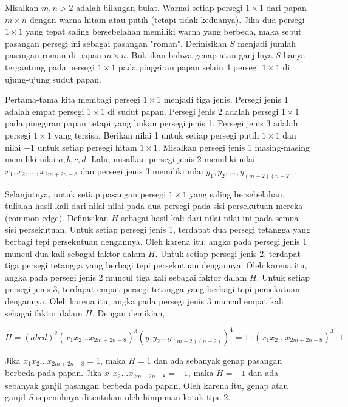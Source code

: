 \documentclass[12pt]{scrartcl}
\begin{document}
\begin{soaljawab}
    Misalkan $m,n > 2$ adalah bilangan bulat. Warnai setiap persegi $1\times1$ dari papan $m\times n$ dengan warna hitam atau putih (tetapi tidak keduanya). Jika dua persegi $1\times1$ yang tepat saling bersebelahan memiliki warna yang berbeda, maka sebut pasangan persegi ini sebagai pasangan "roman". Definisikan $S$ menjadi jumlah pasangan roman di papan $m\times n$. Buktikan bahwa genap atau ganjilnya $S$ hanya tergantung pada persegi $1\times1$ pada pinggiran papan selain 4 persegi $1\times1$ di ujung-ujung sudut papan.
    \begin{solusi}
        Pertama-tama kita membagi persegi $1\times1$ menjadi tiga jenis. Persegi jenis 1 adalah empat persegi $1\times1$ di sudut papan. Persegi jenis 2 adalah persegi $1\times1$ pada pinggiran papan tetapi yang bukan persegi jenis 1. Persegi jenis 3 adalah persegi $1\times1$ yang tersisa. Berikan nilai 1 untuk setiap persegi putih $1\times1$ dan nilai $-1$ untuk setiap persegi hitam $1\times1$. Misalkan persegi jenis 1 masing-masing memiliki nilai $a, b, c, d$. Lalu, misalkan persegi jenis 2 memiliki nilai $x_1, x_2, \dots, x_{2m+2n-8}$ dan persegi jenis 3 memiliki nilai $y_1, y_2, \dots, y_{(m-2)(n-2)}$.
        
        Selanjutnya, untuk setiap pasangan persegi $1\times1$ yang saling bersebelahan, tulislah hasil kali dari nilai-nilai pada dua persegi pada sisi persekutuan mereka (common edge). Definisikan $H$ sebagai hasil kali dari nilai-nilai ini pada semua sisi persekutuan. Untuk setiap persegi jenis 1, terdapat dua persegi tetangga yang berbagi tepi persekutuan dengannya. Oleh karena itu, angka pada persegi jenis 1 muncul dua kali sebagai faktor dalam $H$. Untuk setiap persegi jenis 2, terdapat tiga persegi tetangga yang berbagi tepi persekutuan dengannya. Oleh karena itu, angka pada persegi jenis 2 muncul tiga kali sebagai faktor dalam $H$. Untuk setiap persegi jenis 3, terdapat empat persegi tetangga yang berbagi tepi persekutuan dengannya. Oleh karena itu, angka pada persegi jenis 3 muncul empat kali sebagai faktor dalam $H$. Dengan demikian,

        $$H = (abcd)^2(x_1x_2\dots x_{2m+2n-8})^3(y_1y_2 \dots y_{(m-2)(n-2)})^4 = 1 \cdot (x_1x_2\dots x_{2m+2n-8})^3 \cdot 1$$

        Jika $x_1x_2\dots x_{2m+2n-8} = 1$, maka $H = 1$ dan ada sebanyak genap pasangan berbeda pada papan. Jika $x_1x_2\dots x_{2m+2n-8} = -1$, maka $H = -1$ dan ada sebanyak ganjil pasangan berbeda  pada papan. Oleh karena itu, genap atau ganjil $S$ sepenuhnya ditentukan oleh himpunan kotak tipe 2.
    \end{solusi}
\end{soaljawab}
\end{document}
